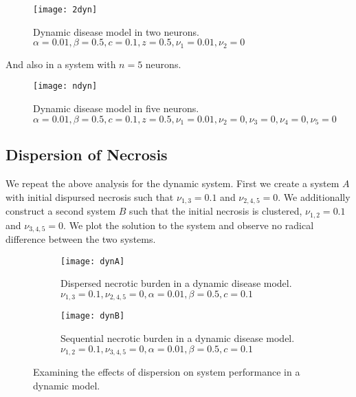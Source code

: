 \documentclass[11pt]{report}
\begin{document}
\begin{figure}[!ht]
  \caption{Dynamic disease model in two neurons. $\alpha = 0.01, \beta = 0.5,c = 0.1,z = 0.5, \nu_1 = 0.01, \nu_2 = 0$ }
  \centering
    \texttt{[image: 2dyn]}
\end{figure}


And also in a system with $n=5$ neurons.

\begin{figure}[!ht]
  \caption{Dynamic disease model in five neurons. $\alpha = 0.01, \beta = 0.5,c = 0.1,z = 0.5, \nu_1 = 0.01, \nu_2 = 0, \nu_3 = 0, \nu_4 = 0, \nu_5 = 0$ }
  \centering
    \texttt{[image: ndyn]}
\end{figure}

\subsection{Dispersion of Necrosis} %
\label{sub:dispersion_of_necrosis}

We repeat the above analysis for the dynamic system. First we create a system $A$ with initial dispursed necrosis such that $\nu_{1,3} = 0.1$ and $\nu_{2,4,5} = 0$. We additionally construct a second system $B$ such that the initial necrosis is clustered, $\nu_{1,2} = 0.1$ and $\nu_{3,4,5} = 0$. We plot the solution to the system and observe no radical difference between the two systems.

\begin{figure}
    \centering
    \begin{subfigure}[b]{0.48\textwidth}
        \texttt{[image: dynA]}
        \caption{Dispersed necrotic burden in a dynamic disease model. $\nu_{1,3} = 0.1, \nu_{2,4,5} = 0, \alpha = 0.01, \beta = 0.5,c = 0.1$}
        \label{fig:statA}
    \end{subfigure}
    \hfill %
    \begin{subfigure}[b]{0.48\textwidth}
        \texttt{[image: dynB]}
        \caption{Sequential necrotic burden in a dynamic disease model. $\nu_{1,2} = 0.1, \nu_{3,4,5} = 0, \alpha = 0.01, \beta = 0.5,c = 0.1$}
        \label{fig:statB}
    \end{subfigure}
    \caption{Examining the effects of dispersion on system performance in a dynamic model. }\label{fig:dispersion}
\end{figure}
\end{document}
